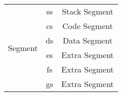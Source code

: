 \documentclass[11pt,a5paper,footinclude=true,headinclude=true]{scrbook} %
\begin{document}
\begin{center}
\begin{tabular}{|c|c|c|c|}
		\hline
		\multirow{6}{*}{Segment}          & \multicolumn{2}{c|}{ss}                  & Stack Segment\\
		\cline{2-4}
		                                  & \multicolumn{2}{c|}{cs}                  & Code Segment\\
		\cline{2-4}
		                                  & \multicolumn{2}{c|}{ds}                  & Data Segment\\
		\cline{2-4}
		                                  & \multicolumn{2}{c|}{es}                  & Extra Segment\\
		\cline{2-4}
		                                  & \multicolumn{2}{c|}{fs}                  & Extra Segment\\
		\cline{2-4}
		                                  & \multicolumn{2}{c|}{gs}                  & Extra Segment\\
		\hline
	\end{tabular}
\end{center}
\end{document}

